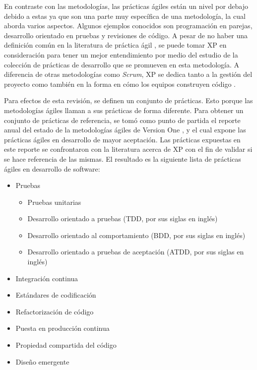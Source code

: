 \documentclass[journal]{IEEEtran}
\begin{document}
En contraste con las metodologías, las prácticas ágiles están un nivel por debajo debido a estas ya que son una parte muy específica de una metodología, la cual aborda varios aspectos. Algunos ejemplos conocidos son programación en parejas, desarrollo orientado en pruebas y revisiones de código. A pesar de no haber una definición común en la literatura de práctica ágil \cite{diebold-dahlem}, se puede tomar XP en consideración para tener un mejor entendimiento por medio del estudio de la colección de prácticas de desarrollo que se promueven en esta metodología. A diferencia de otras metodologías como \emph{Scrum}, XP se dedica tanto a la gestión del proyecto como también en la forma en cómo los equipos construyen código \cite{shore-warden}.

Para efectos de esta revisión, se definen un conjunto de prácticas. Esto porque las metodologías ágiles llaman a sus prácticas de forma diferente. Para obtener un conjunto de prácticas de referencia, se tomó como punto de partida el reporte anual del estado de la metodologías ágiles de Version One \cite{version-one}, y el cual expone las prácticas ágiles en desarrollo de mayor aceptación. Las prácticas expuestas en este reporte se confrontaron con la literatura acerca de XP \cite{beck-andres, ford, shore-warden} con el fin de validar si se hace referencia de las mismas. El resultado es la siguiente lista de prácticas ágiles en desarrollo de software:
\begin{itemize}
    \item Pruebas
        \begin{itemize}
            \item Pruebas unitarias
            \item Desarrollo orientado a pruebas (TDD, por sus siglas en inglés)
            \item Desarrollo orientado al comportamiento (BDD, por sus siglas en inglés)
            \item Desarrollo orientado a pruebas de aceptación (ATDD, por sus siglas en inglés)
        \end{itemize}
        \item Integración continua
        \item Estándares de codificación
        \item Refactorización de código
        \item Puesta en producción continua
        \item Propiedad compartida del código
        \item Diseño emergente
\end{itemize}
\end{document}
